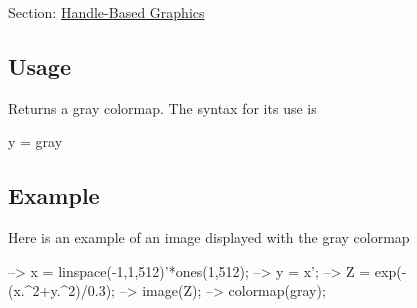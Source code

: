 Section\-: \hyperlink{sec_handle}{Handle-\/\-Based Graphics} \hypertarget{vtkwidgets_vtkxyplotwidget_Usage}{}\subsection{Usage}\label{vtkwidgets_vtkxyplotwidget_Usage}
Returns a gray colormap. The syntax for its use is \begin{DoxyVerb}   y = gray
\end{DoxyVerb}
 \hypertarget{variables_struct_Example}{}\subsection{Example}\label{variables_struct_Example}
Here is an example of an image displayed with the {\ttfamily gray} colormap


\begin{DoxyVerbInclude}
--> x = linspace(-1,1,512)'*ones(1,512);
--> y = x';
--> Z = exp(-(x.^2+y.^2)/0.3);
--> image(Z);
--> colormap(gray);
\end{DoxyVerbInclude}


